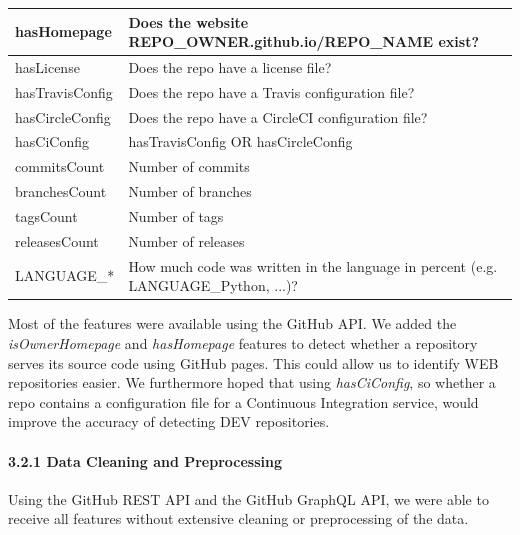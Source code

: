 \documentclass{article}
\begin{document}
\begin{table}[]
\begin{tabularx}{\linewidth}{|l|X|}
hasHomepage            & Does the website \newline{}REPO\_OWNER.github.io/REPO\_NAME exist?                           \\ \hline
hasLicense             & Does the repo have a license file?                                                 \\ \hline
hasTravisConfig        & Does the repo have a Travis configuration file?                                    \\ \hline
hasCircleConfig        & Does the repo have a CircleCI configuration file?                                  \\ \hline
hasCiConfig            & hasTravisConfig OR hasCircleConfig                                                 \\ \hline
commitsCount           & Number of commits                                                                  \\ \hline
branchesCount          & Number of branches                                                                 \\ \hline
tagsCount              & Number of tags                                                                     \\ \hline
releasesCount          & Number of releases                                                                 \\ \hline
LANGUAGE\_*            & How much code was written in the language in percent (e.g. LANGUAGE\_Python, ...)? \\ \hline
\end{tabularx}
\end{table}

Most of the features were available using the GitHub API. We added the
\emph{isOwnerHomepage} and \emph{hasHomepage} features to detect whether
a repository serves its source code using GitHub pages. This could allow
us to identify WEB repositories easier. We furthermore hoped that using
\emph{hasCiConfig}, so whether a repo contains a configuration file for
a Continuous Integration service, would improve the accuracy of
detecting DEV repositories.

\paragraph{3.2.1 Data Cleaning and
Preprocessing}\label{data-cleaning-and-preprocessing}

Using the GitHub REST API and the GitHub GraphQL API, we were able to
receive all features without extensive cleaning or preprocessing of the
data.
\end{document}
